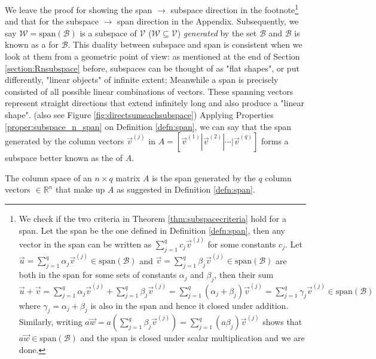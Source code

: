 We leave the proof for showing the span $\rightarrow$ subspace direction in the footnote\footnote{We check if the two criteria in Theorem \ref{thm:subspacecriteria} hold for a span. Let the span be the one defined in Definition \ref{defn:span}, then any vector in the span can be written as $\sum_{j=1}^{q} c_j\vec{v}^{(j)}$ for some constants $c_j$. Let $\vec{u} = \sum_{j=1}^{q} \alpha_j\vec{v}^{(j)} \in \text{span}(\mathcal{B})$ and $\vec{v} = \sum_{j=1}^{q} \beta_j\vec{v}^{(j)} \in \text{span}(\mathcal{B})$ are both in the span for some sets of constants $\alpha_j$ and $\beta_j$, then their sum $\vec{u} + \vec{v} = \sum_{j=1}^{q} \alpha_j\vec{v}^{(j)} + \sum_{j=1}^{q} \beta_j\vec{v}^{(j)} = \sum_{j=1}^{q} (\alpha_j + \beta_j)\vec{v}^{(j)} = \sum_{j=1}^{q} \gamma_j\vec{v}^{(j)} \in \text{span}(\mathcal{B})$ where $\gamma_j = \alpha_j + \beta_j$ is also in the span and hence it closed under addition. Similarly, writing $a\vec{w} = a(\sum_{j=1}^{q} \beta_j\vec{v}^{(j)}) = \sum_{j=1}^{q} (a\beta_j)\vec{v}^{(j)}$ shows that $a\vec{w} \in \text{span}(\mathcal{B})$ and the span is closed under scalar multiplication and we are done.} 
and that for the subspace $\rightarrow$ span direction in the Appendix. Subsequently, we say $\mathcal{W} = \text{span}(\mathcal{B})$ is a subspace of $\mathcal{V}$ ($\mathcal{W} \subseteq \mathcal{V}$) \textit{generated} by the set $\mathcal{B}$ and $\mathcal{B}$ is known as a  for $\mathcal{B}$. This duality between subspace and span is consistent when we look at them from a geometric point of view: as mentioned at the end of Section \ref{section:Rnsubspace} before, subspaces can be thought of as "flat shapes", or put differently, "linear objects" of infinite extent; Meanwhile a span is precisely consisted of all possible linear combinations of vectors. These spanning vectors represent straight directions that extend infinitely long and also produce a "linear shape". (also see Figure \ref{fig:directsumeachsubspace}) Applying Properties \ref{proper:subspace_n_span} on Definition \ref{defn:span}, we can say that the span generated by the column vectors $\vec{v}^{(j)}$ in $A = [\vec{v}^{(1)}|\vec{v}^{(2)}|\cdots|\vec{v}^{(q)}]$ forms a subspace better known as the  of $A$.
\begin{defn}
\label{defn:colspace}
The column space of an $n \times q$ matrix $A$ is the span generated by the $q$ column vectors $\in \mathbb{R}^n$ that make up $A$ as suggested in Definition \ref{defn:span}.
\end{defn}
